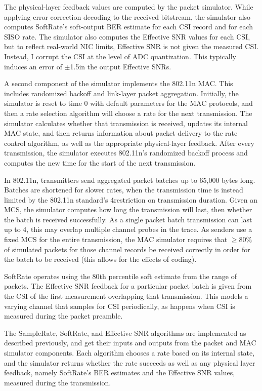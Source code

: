 The physical-layer feedback values are computed by the packet simulator. While applying error correction decoding to the received bitstream, the simulator also computes SoftRate's soft-output BER estimate for each CSI record and for each SISO rate. The simulator also computes the Effective SNR values for each CSI, but to reflect real-world NIC limits, Effective SNR is not given the measured CSI. Instead, I corrupt the CSI at the level of ADC quantization. This typically induces an error of $\pm$1.5\dB in the output Effective SNRs.

A second component of the simulator implements the 802.11n MAC. This includes randomized backoff and link-layer packet aggregation. Initially, the simulator is reset to time 0 with default parameters for the MAC protocols, and then a rate selection algorithm will choose a rate for the next transmission. The simulator calculates whether that transmission is received, updates its internal MAC state, and then returns information about packet delivery to the rate control algorithm, as well as the appropriate physical-layer feedback. After every transmission, the simulator executes 802.11n's randomized backoff process and computes the new time for the start of the next transmission.

In 802.11n, transmitters send aggregated packet batches up to 65,000 bytes long. Batches are shortened for slower rates, when the transmission time is instead limited by the 802.11n standard's 4\ms restriction on transmission duration. Given an MCS, the simulator computes how long the transmission will last, then whether the batch is received successfully. As a single packet batch transmission can last up to 4\ms, this may overlap multiple channel probes in the trace. As senders use a fixed MCS for the entire transmission, the MAC simulator requires that $\geq$80\% of simulated packets for those channel records be received correctly in order for the batch to be received (this allows for the effects of coding).

SoftRate operates using the 80th percentile soft estimate from the range of packets. The Effective SNR feedback for a particular packet batch is given from the CSI of the first measurement overlapping that transmission. This models a varying channel that samples for CSI periodically, as happens when CSI is measured during the packet preamble.

The SampleRate, SoftRate, and Effective SNR algorithms are implemented as described previously, and get their inputs and outputs from the packet and MAC simulator components. Each algorithm chooses a rate based on its internal state, and the simulator returns whether the rate succeeds as well as any physical layer feedback, namely SoftRate's BER estimates and the Effective SNR values, measured during the transmission.

